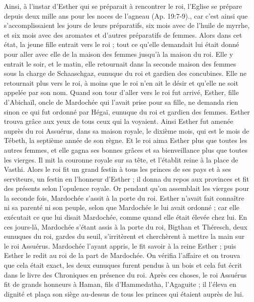 \begin{multicols}{2}
{Ainsi, à l'instar d'Esther qui se préparait à rencontrer le roi, l'Eglise se prépare depuis deux mille ans pour les noces de l'agneau (Ap. 19:7-9).}, car c'est ainsi que s'accomplissaient les jours de leurs préparatifs, six mois avec de l'huile de myrrhe, et six mois avec des aromates et d'autres préparatifs de femmes.
 Alors dans cet état, la jeune fille entrait vers le roi ; tout ce qu'elle demandait lui était donné pour aller avec elle de la maison des femmes jusqu'à la maison du roi.
Elle y entrait le soir, et le matin, elle retournait dans la seconde maison des femmes sous la charge de Schaaschgaz, eunuque du roi et gardien des concubines. Elle ne retournait plus vers le roi, à moins que le roi n'en ait le désir et qu'elle ne soit appelée par son nom.
Quand son tour d'aller vers le roi fut arrivé, Esther, fille d'Abichaïl, oncle de Mardochée qui l'avait prise pour sa fille, ne demanda rien sinon ce qui fut ordonné par Hégaï, eunuque du roi et gardien des femmes. Esther trouva grâce aux yeux de tous ceux qui la voyaient.
Ainsi Esther fut amenée auprès du roi Assuérus, dans sa maison royale, le dixième mois, qui est le mois de Tébeth, la septième année de son règne.
Et le roi aima Esther plus que toutes les autres femmes, et elle gagna ses bonnes grâces et sa bienveillance plus que toutes les vierges. Il mit la couronne royale sur sa tête, et l'établit reine à la place de Vasthi.
Alors le roi fit un grand festin à tous les princes de ses pays et à ses serviteurs, un festin en l'honneur d'Esther ; il donna du repos aux provinces et fit des présents selon l'opulence royale.
Or pendant qu'on assemblait les vierges pour la seconde fois, Mardochée s'assit à la porte du roi.
Esther n'avait fait connaître ni sa parenté ni son peuple, selon que Mardochée le lui avait ordonné ; car elle exécutait ce que lui disait Mardochée, comme quand elle était élevée chez lui.
En ces jours-là, Mardochée s'étant assis à la porte du roi, Bigthan et Théresch, deux eunuques du roi, gardes du seuil, s'irritèrent et cherchèrent à mettre la main sur le roi Assuérus.
Mardochée l'ayant appris, le fit savoir à la reine Esther ; puis Esther le redit au roi de la part de Mardochée.
On vérifia l'affaire et on trouva que cela était exact, les deux eunuques furent pendus à un bois et cela fut écrit dans le livre des Chroniques en présence du roi.
\VerseOne{}Après ces choses, le roi Assuérus fit de grands honneurs à Haman, fils d'Hammedatha, l'Agaguite ; il l'éleva en dignité et plaça son siège au-dessus de tous les princes qui étaient auprès de lui.

\end{multicols}

